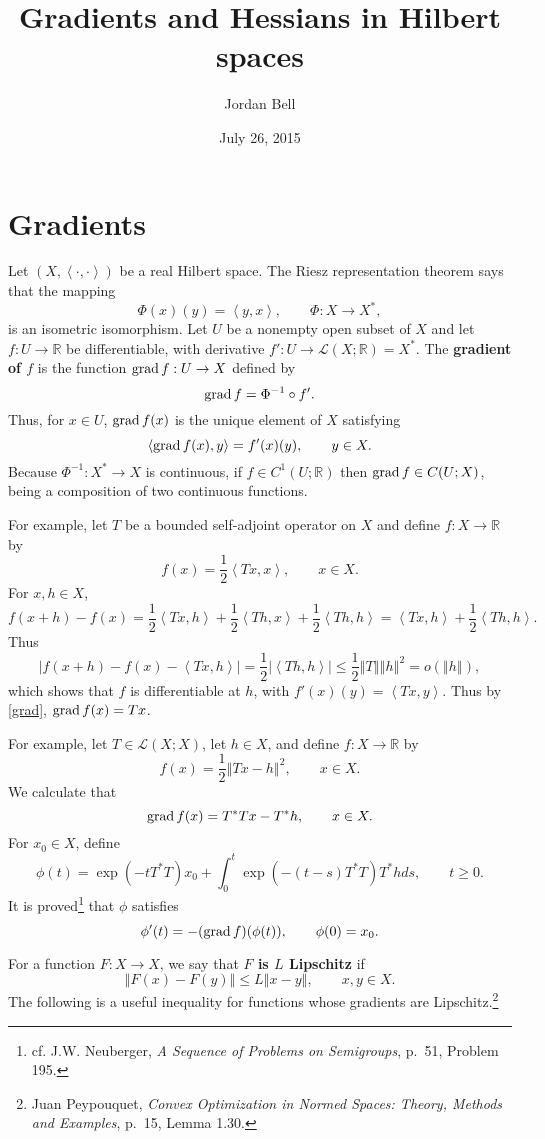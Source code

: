 \documentclass{article}
\newcommand{\inner}[2]{\left\langle #1, #2 \right\rangle}
\newcommand{\grad}{\ensuremath\mathrm{grad}\,}
\newcommand{\norm}[1]{\left\Vert #1 \right\Vert}
\theoremstyle{definition}
\theoremstyle{definition}
\begin{document}
\title{Gradients and Hessians in Hilbert spaces}
\author{Jordan Bell}
\date{July 26, 2015}

\maketitle

\section{Gradients}
Let $(X,\inner{\cdot}{\cdot})$ be a real Hilbert space. The Riesz representation theorem says that
the mapping
\[
\Phi(x)(y)=\inner{y}{x}, \qquad \Phi:X \to X^*,
\]
 is an isometric isomorphism. 
Let $U$ be a nonempty open subset of $X$ and 
let $f:U \to \mathbb{R}$ be differentiable, with derivative
$f':U \to \mathscr{L}(X;\mathbb{R})=X^*$.
The \textbf{gradient of $f$} is the function $\grad f:U \to X$ defined by
\[
\grad f = \Phi^{-1} \circ f'.
\]  
Thus, for $x \in U$, $\grad f(x)$ is the unique element of $X$ satisfying
\begin{equation}
\inner{\grad f(x)}{y}=f'(x)(y), \qquad y \in X.
\label{grad}
\end{equation}
Because $\Phi^{-1}:X^* \to X$ is continuous,
if $f \in C^1(U;\mathbb{R})$ then $\grad f \in C(U;X)$, being a composition of two continuous functions.

For example, let $T$ be a bounded self-adjoint operator on $X$ and define $f:X \to \mathbb{R}$ by
\[
f(x) = \frac{1}{2}\inner{Tx}{x}, \qquad x \in X.
\]
For $x,h \in X$,
\[
f(x+h)-f(x) = \frac{1}{2}\inner{Tx}{h}+\frac{1}{2}\inner{Th}{x}+\frac{1}{2}\inner{Th}{h}
=\inner{Tx}{h}+\frac{1}{2}\inner{Th}{h}.
\]
Thus
\[
|f(x+h)-f(x)-\inner{Tx}{h}| = \frac{1}{2}|\inner{Th}{h}| \leq \frac{1}{2} \norm{T} \norm{h}^2 = o(\norm{h}),
\]
which shows that $f$ is differentiable at $h$, with $f'(x)(y) = \inner{Tx}{y}$. 
Thus by \eqref{grad}, $\grad f(x) = Tx$. 

For example, let $T \in \mathscr{L}(X;X)$, let $h \in X$, and define $f:X \to \mathbb{R}$ by
\[
f(x) = \frac{1}{2} \norm{Tx-h}^2, \qquad  x \in X.
\]
We calculate that
\[
\grad f(x) = T^*Tx-T^*h, \qquad x \in X.
\]
For $x_0 \in X$, define
\[
\phi(t) = \exp(-tT^*T)x_0 + \int_0^t \exp(-(t-s)T^*T)T^*h ds, \qquad t \geq 0.
\]
It is proved\footnote{cf. J.W. Neuberger, {\em A Sequence of Problems on Semigroups}, p.~51, Problem 195.}
that $\phi$ satisfies
\[
\phi'(t) = -(\grad f)(\phi(t)), \qquad \phi(0)=x_0.
\]


For a function $F:X \to X$, we say that \textbf{$F$ is $L$ Lipschitz} if
\[
\norm{F(x)-F(y)} \leq L \norm{x-y}, \qquad x,y \in X.
\] 
The following is a useful inequality for functions whose gradients are Lipschitz.\footnote{Juan Peypouquet,
{\em Convex Optimization in Normed Spaces: Theory, Methods and Examples}, p.~15, Lemma 1.30.}
\end{document}
